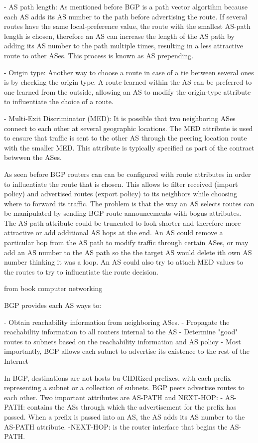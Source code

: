 \documentclass[11pt]{report}
\begin{document}
- AS path length: As mentioned before BGP is a path vector algortihm because each AS adds its AS number to the path before advertising the route. If several routes have the same local-preference value, the route with the smallest AS-path length is chosen, therefore an AS can increase the length of the AS path by adding its AS number to the path multiple times, resulting in a less attractive route to other ASes. This process is known as AS prepending.

- Origin type: Another way to choose a route in case of a tie between several ones is by checking the origin type. A route learned within the AS can be preferred to one learned from the outside, allowing an AS to modify the origin-type attribute to influentiate the choice of a route.

- Multi-Exit Discriminator (MED): It is possible that two neighboring ASes connect to each other at several geographic locations. The MED attribute is used to ensure that traffic is sent to the other AS through the peering location route with the smaller MED. This attribute is typically specified as part of the contract betwwen the ASes.


As seen before BGP routers can can be configured with route attributes in order to influentiate the route that is chosen. This allows to filter received (import policy) and advertised routes (export policy) to its neighbors while choosing where to forward its traffic. The problem is that the way an AS selects routes can be manipulated by sending BGP route announcements with bogus attributes. The AS-path attribute could be truncated to look shorter and therefore more attractive or add additional AS hops at the end. An AS could remove a particular hop from the AS path to modify traffic through certain ASes, or may add an AS number to the AS path so the the target AS would delete ith own AS number thinking it was a loop. An AS could also try to attach MED values to the routes to try to influentiate the route decision. 

from book computer networking

BGP provides each AS ways  to:

- Obtain reachability information from neighboring ASes.
- Propagate the reachability information to all routers internal to the AS
- Determine "good" routes to subnets based on the reachability information and AS policy
- Most importantly, BGP allows each subnet to advertise its existence to the rest of the Internet

In BGP, destinations are not hosts bu CIDRized prefixes, with each prefix representing a subnet or a collection of subnets. BGP peers advertise routes to each other. Two important attributes are AS-PATH and NEXT-HOP:
 - AS-PATH: contains the ASs through which the advertisement for the prefix has passed. When a prefix is passed into an AS, the AS adds its AS number to the AS-PATH attribute.
 -NEXT-HOP: is the router interface that begins the AS-PATH. 
\end{document}
